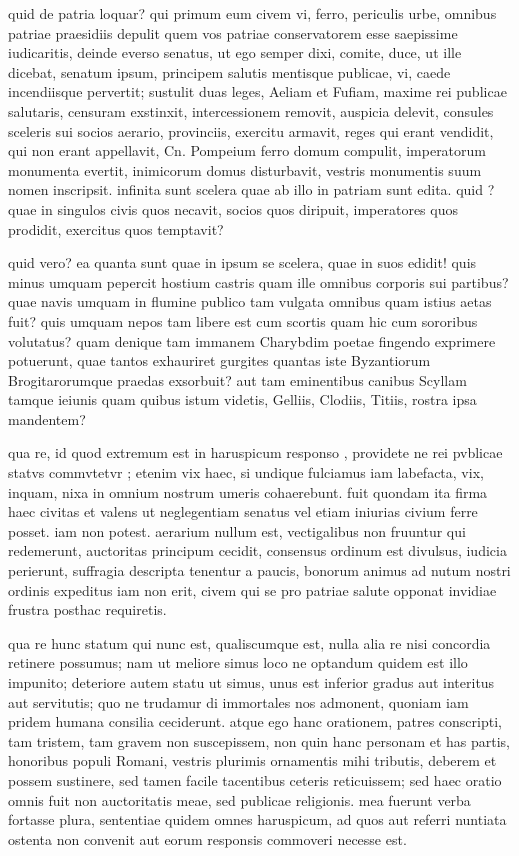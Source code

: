  quid de patria loquar? qui primum eum civem vi, ferro, periculis urbe, omnibus patriae praesidiis depulit quem vos patriae conservatorem esse saepissime iudicaritis, deinde everso senatus, ut ego semper dixi, comite, duce, ut ille dicebat, senatum ipsum, principem salutis mentisque publicae, vi, caede incendiisque pervertit; sustulit duas leges, Aeliam et Fufiam, maxime rei publicae salutaris, censuram exstinxit, intercessionem removit, auspicia delevit, consules sceleris sui socios aerario, provinciis, exercitu armavit, reges qui erant vendidit, qui non erant appellavit, Cn. Pompeium ferro domum compulit, imperatorum monumenta evertit, inimicorum domus disturbavit, vestris monumentis suum nomen inscripsit. infinita sunt scelera quae ab illo in patriam sunt edita. quid ? quae in singulos civis quos necavit, socios quos diripuit, imperatores quos prodidit, exercitus quos temptavit?

 quid vero? ea quanta sunt quae in ipsum se scelera, quae in suos edidit! quis minus umquam pepercit hostium castris quam ille omnibus corporis sui partibus? quae navis umquam in flumine publico tam vulgata omnibus quam istius aetas fuit? quis umquam nepos tam libere est cum scortis quam hic cum sororibus volutatus? quam denique tam immanem Charybdim poetae fingendo exprimere potuerunt, quae tantos exhauriret gurgites quantas iste Byzantiorum Brogitarorumque praedas exsorbuit? aut tam eminentibus canibus Scyllam tamque ieiunis quam quibus istum videtis, Gelliis, Clodiis, Titiis, rostra ipsa mandentem?

 qua re, id quod extremum est in haruspicum responso , providete ne rei pvblicae statvs commvtetvr ; etenim vix haec, si undique fulciamus iam labefacta, vix, inquam, nixa in omnium nostrum umeris cohaerebunt. fuit quondam ita firma haec civitas et valens ut neglegentiam senatus vel etiam iniurias civium ferre posset. iam non potest. aerarium nullum est, vectigalibus non fruuntur qui redemerunt, auctoritas principum cecidit, consensus ordinum est divulsus, iudicia perierunt, suffragia descripta tenentur a paucis, bonorum animus ad nutum nostri ordinis expeditus iam non erit, civem qui se pro patriae salute opponat invidiae frustra posthac requiretis.

 qua re hunc statum qui nunc est, qualiscumque est, nulla alia re nisi concordia retinere possumus; nam ut meliore simus loco ne optandum quidem est illo impunito; deteriore autem statu ut simus, unus est inferior gradus aut interitus aut servitutis; quo ne trudamur di immortales nos admonent, quoniam iam pridem humana consilia ceciderunt. atque ego hanc orationem, patres conscripti, tam tristem, tam gravem non suscepissem, non quin hanc personam et has partis, honoribus populi Romani, vestris plurimis ornamentis mihi tributis, deberem et possem sustinere, sed tamen facile tacentibus ceteris reticuissem; sed haec oratio omnis fuit non auctoritatis meae, sed publicae religionis. mea fuerunt verba fortasse plura, sententiae quidem omnes haruspicum, ad quos aut referri nuntiata ostenta non convenit aut eorum responsis commoveri necesse est.

